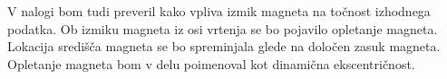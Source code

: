 V nalogi bom tudi preveril kako vpliva izmik magneta na točnost izhodnega podatka. Ob izmiku magneta iz osi vrtenja se bo pojavilo opletanje magneta. Lokacija središča magneta se bo spreminjala glede na določen zasuk magneta. Opletanje magneta bom v delu poimenoval kot dinamična ekscentričnost.














%
%
%
%
%
